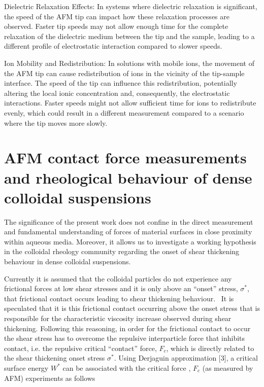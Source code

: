 Dielectric Relaxation Effects: In systems where dielectric relaxation is significant, the speed of the AFM tip can impact how these relaxation processes are observed. Faster tip speeds may not allow enough time for the complete relaxation of the dielectric medium between the tip and the sample, leading to a different profile of electrostatic interaction compared to slower speeds.

Ion Mobility and Redistribution: In solutions with mobile ions, the movement of the AFM tip can cause redistribution of ions in the vicinity of the tip-sample interface. The speed of the tip can influence this redistribution, potentially altering the local ionic concentration and, consequently, the electrostatic interactions. Faster speeds might not allow sufficient time for ions to redistribute evenly, which could result in a different measurement compared to a scenario where the tip moves more slowly.

\section*{AFM contact force measurements and rheological behaviour of dense colloidal suspensions}

The significance of the present work does not confine in the direct measurement and fundamental understanding of forces of material surfaces in close proximity within aqueous media. Moreover, it allows us to investigate a working hypothesis in the colloidal rheology community regarding the onset of shear thickening behaviour in dense colloidal suspensions.~\cite{reference1}

Currently it is assumed that the colloidal particles do not experience any frictional forces at low shear stresses and it is only above an ``onset'' stress, $\sigma^*$, that frictional contact occurs leading to shear thickening behaviour.~\cite{reference2} It is speculated that it is this frictional contact occurring above the onset stress that is responsible for the characteristic viscosity increase observed during shear thickening. Following this reasoning, in order for the frictional contact to occur the shear stress has to overcome the repulsive interparticle force that inhibits contact, i.e. the repulsive critical “contact” force, $F_c$, which is directly related to the shear thickening onset stress $\sigma^*$. Using Derjaguin approximation [3], a critical surface energy $W^*$ can be associated with the critical force , $F_c$ (as measured by AFM) experiments as follows

